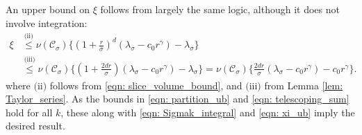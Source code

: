 \documentclass[11pt,twoside]{article}
\theoremstyle{definition}
\newcommand{\1}{\mathbbm{1}}
\newcommand{\Cset}{\mathcal{C}}
\newcommand{\Csig}{\Cset_{\sigma}}
\begin{document}
	An upper bound on $\xi$ follows from largely the same logic, although it does not involve integration:
	\begin{align}
	\xi & \overset{\text{(ii)}}{\leq} \nu(\Csig) \biggl\{ \left(1 + \frac{ r}{\sigma}\right)^d(\lambda_{\sigma} - c_0r^{\gamma}) - \lambda_{\sigma} \biggr\} \nonumber \\
	& \overset{\text{(iii)}}{\leq} \nu(\Csig) \biggl\{ \left(1 + \frac{2d r}{\sigma}\right)(\lambda_{\sigma} - c_0r^{\gamma}) - \lambda_{\sigma} \biggr\} = \nu(\Csig) \biggl\{ \frac{2dr}{\sigma}(\lambda_{\sigma} - c_0r^{\gamma}) - c_0 r^{\gamma} \biggr\}. \label{eqn: xi_ub}
	\end{align}
	where $\text{(ii)}$ follows from \eqref{eqn: slice_volume_bound}, and $\text{(iii)}$ from Lemma \ref{lem: Taylor_series}. As the bounds in \eqref{eqn: partition_ub} and \eqref{eqn: telescoping_sum} hold for all $k$, these along with \eqref{eqn: Sigmak_integral} and \eqref{eqn: xi_ub} imply the desired result.



\end{document}

